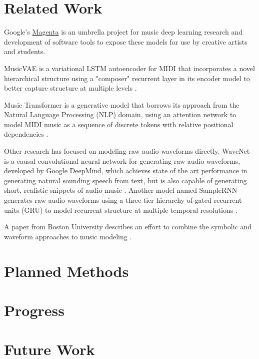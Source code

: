 \documentclass[sigconf,authorversion]{acmart}
\begin{document}
\section{Related Work}

Google's \href{https://magenta.tensorflow.org/}{Magenta} is an umbrella project
for music deep learning research and development of software tools to expose
these models for use by creative artists and students.

MusicVAE is a variational LSTM autoencoder for MIDI that incorporates a
novel hierarchical structure using a "composer" recurrent layer in its encoder
model to better capture structure at multiple
levels \cite{roberts_hierarchical_2018}.

Music Transformer is a generative model that borrows its approach from the
Natural Language Processing (NLP) domain, using an attention network to model
MIDI music as a sequence of discrete tokens with relative positional dependencies
\cite{huang_music_2018}.

Other research has focused on modeling raw audio waveforms directly. WaveNet is
a causal convolutional neural network for generating raw audio waveforms,
developed by Google DeepMind, which achieves state of the art performance in
generating natural sounding speech from text, but is also capable of generating
short, realistic snippets of audio music \cite{oord_wavenet_2016}. Another model
named SampleRNN generates raw audio waveforms using a three-tier hierarchy of
gated recurrent units (GRU) to model recurrent structure at multiple temporal
resolutions \cite{mehri_samplernn_2017}.

A paper from Boston University describes an effort to combine the symbolic and
waveform approaches to music modeling \cite{manzelli_conditioning_2018}.

\section{Planned Methods}

\section{Progress}

\section{Future Work}



\end{document}
